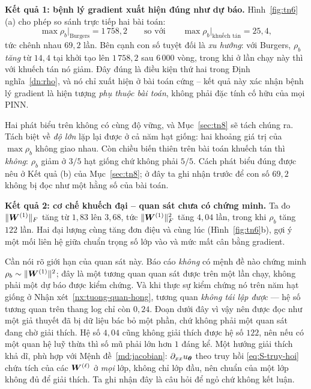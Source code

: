 \textbf{Kết quả 1: bệnh lý gradient xuất hiện đúng như dự báo.}
Hình~\ref{fig:tn6}(a) cho phép so sánh trực tiếp hai bài toán:
\begin{equation}
\max\rho_b\big|_{\text{Burgers}} = 1\,758{,}2
\qquad\text{so với}\qquad
\max\rho_b\big|_{\text{khuếch tán}} = 25{,}4,
\label{eq:so-sanh-rho}
\end{equation}
tức chênh nhau $69{,}2$ lần. Bên cạnh con số tuyệt đối là \emph{xu hướng}:
với Burgers, $\rho_b$ \emph{tăng} từ $14{,}4$ tại khởi tạo lên $1\,758{,}2$ sau
$6\,000$ vòng, trong khi ở lần chạy này thì với khuếch tán nó giảm. Đây đúng là
điều kiện thứ hai trong Định nghĩa~\ref{dn:rho}, và nó chỉ xuất hiện ở bài toán
cứng -- kết quả này xác nhận bệnh lý gradient là hiện tượng \emph{phụ thuộc bài
toán}, không phải đặc tính cố hữu của mọi PINN.

Hai phát biểu trên không có cùng độ vững, và Mục~\ref{sec:tn8} sẽ tách chúng ra.
Tách biệt về \emph{độ lớn} lặp lại được ở cả năm hạt giống: hai khoảng giá trị
của $\max\rho_b$ không giao nhau. Còn chiều biến thiên trên bài toán khuếch tán
thì \emph{không}: $\rho_b$ giảm ở $3/5$ hạt giống chứ không phải $5/5$. Cách
phát biểu đúng được nêu ở Kết quả (b) của Mục~\ref{sec:tn8}; ở đây ta ghi nhận
trước để con số $69{,}2$ không bị đọc như một hằng số của bài toán.
 
\textbf{Kết quả 2: cơ chế khuếch đại -- quan sát chưa có chứng minh.} Ta đo
$\lVert\bm{W}^{(1)}\rVert_F$ tăng từ $1{,}83$ lên $3{,}68$, tức
$\lVert\bm{W}^{(1)}\rVert_F^2$ tăng $4{,}04$ lần, trong khi $\rho_b$ tăng $122$ lần. Hai
đại lượng cùng tăng đơn điệu và cùng lúc (Hình~\ref{fig:tn6}b), gợi ý một mối liên
hệ giữa chuẩn trọng số lớp vào và mức mất cân bằng gradient.
 
Cần nói rõ giới hạn của quan sát này. Báo cáo \emph{không} có mệnh đề nào chứng
minh $\rho_b \sim \lVert\bm{W}^{(1)}\rVert^2$; đây là một tương quan quan sát được trên
một lần chạy, không phải một dự báo được kiểm chứng. Và khi thực sự kiểm chứng
nó trên năm hạt giống ở Nhận xét~\ref{nx:tuong-quan-hong}, tương quan \emph{không
tái lập được} --- hệ số tương quan trên thang log chỉ còn $0{,}24$. Đoạn dưới đây
vì vậy nên được đọc như một giả thuyết đã bị dữ liệu bác bỏ một phần, chứ không
phải một quan sát đang chờ giải thích. Hệ số $4{,}04$ cũng không
giải thích được hệ số $122$, nên nếu có một quan hệ luỹ thừa thì số mũ phải lớn
hơn $1$ đáng kể. Một hướng giải thích khả dĩ, phù hợp với
Mệnh đề~\ref{md:jacobian}: $\partial_{xx}u_{\bm{\theta}}$ theo truy hồi
\eqref{eq:S-truy-hoi} chứa tích của các $\bm{W}^{(\ell)}$ ở \emph{mọi} lớp, không chỉ
lớp đầu, nên chuẩn của một lớp không đủ để giải thích. Ta ghi nhận đây là câu hỏi
để ngỏ chứ không kết luận.
 
